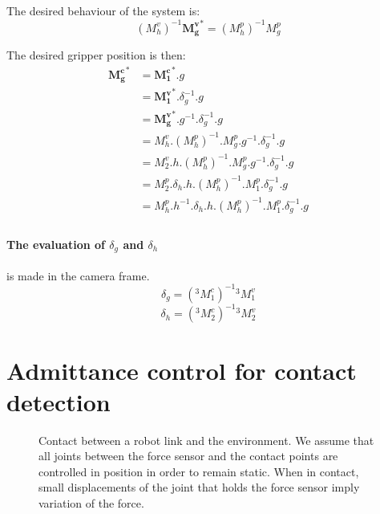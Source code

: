 \documentclass{article}
\newcommand{\M}[3]{{^#1}M^{#2}_{#3}}
\newcommand{\Minv}[3]{{\left( \M{#1}{#2}{#3} \right) }^{-1}}
\newcommand{\oM}[2]{M^{#1}_{#2}}
\newcommand{\oMinv}[2]{{\left( \oM{#1}{#2} \right) }^{-1}}
\begin{document}
The desired behaviour of the system is:
$$ \oMinv{v}{h} {\bm{\oM{v}{g}}}^* = \oMinv{p}{h} {\oM{p}{g}} $$

The desired gripper position is then:
\begin{align*}
{\bm{\oM{c}{g}}}^* &= {\bm{\oM{c}{1}}}^*                                                    . g \\
                   &= {\bm{\oM{v}{1}}}^*                                      .\delta_g^{-1}. g \\
                   &= {\bm{\oM{v}{g}}}^*                               .g^{-1}.\delta_g^{-1}. g \\
                   &= \oM{v}{h}.\oMinv{p}{h}.{\oM{p}{g}}               .g^{-1}.\delta_g^{-1}. g \\
                   &= \oM{v}{2}.       h.\oMinv{p}{h}.\oM{p}{g}        .g^{-1}.\delta_g^{-1}. g \\
                   &= \oM{p}{2}.\delta_h.h.\oMinv{p}{h}.\oM{p}{1}               .\delta_g^{-1}. g \\
                   &= \oM{p}{h}.h^{-1}.\delta_h.h.\oMinv{p}{h}.\oM{p}{1}               .\delta_g^{-1}. g \\
\end{align*}

\paragraph{The evaluation of $\delta_g$ and $\delta_h$} is made in the camera frame.
$$ \delta_g = \Minv{3}{c}{1} \M{3}{v}{1} $$
$$ \delta_h = \Minv{3}{c}{2} \M{3}{v}{2} $$

\section{Admittance control for contact detection}

\begin{figure}
    \centering
    \def\svgwidth{\columnwidth}
    \graphicspath{{./figures/}}
    \scalebox{.8}{}
    \caption{Contact between a robot link and the environment. We assume that
      all joints between the force sensor and the contact points are controlled
      in position in order to remain static. When in contact, small
      displacements of the joint that holds the force sensor imply variation
      of the force.}
    \label{fig:contact}
\end{figure}
\end{document}
